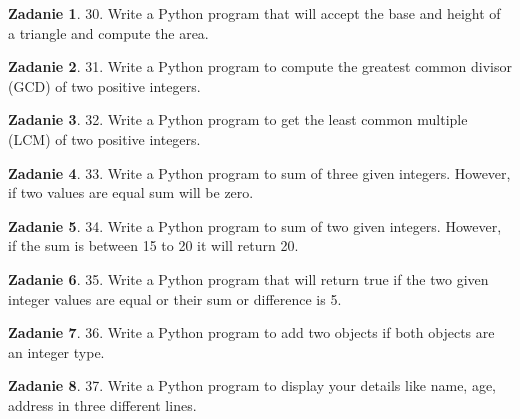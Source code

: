 \documentclass[11pt]{article}
\theoremstyle{definition}
\newtheorem{zadanie}{Zadanie}
\begin{document}
\begin{zadanie}


30. Write a Python program that will accept the base and height of a triangle and compute the area. 

\end{zadanie}

\begin{zadanie}


31. Write a Python program to compute the greatest common divisor (GCD) of two positive integers. 

\end{zadanie}

\begin{zadanie}


32. Write a Python program to get the least common multiple (LCM) of two positive integers. 

\end{zadanie}

\begin{zadanie}


33. Write a Python program to sum of three given integers. However, if two values are equal sum will be zero. 

\end{zadanie}

\begin{zadanie}


34. Write a Python program to sum of two given integers. However, if the sum is between 15 to 20 it will return 20. 

\end{zadanie}

\begin{zadanie}


35. Write a Python program that will return true if the two given integer values are equal or their sum or difference is 5. 

\end{zadanie}

\begin{zadanie}


36. Write a Python program to add two objects if both objects are an integer type. 

\end{zadanie}

\begin{zadanie}


37. Write a Python program to display your details like name, age, address in three different lines. 

\end{zadanie}
\end{document}
